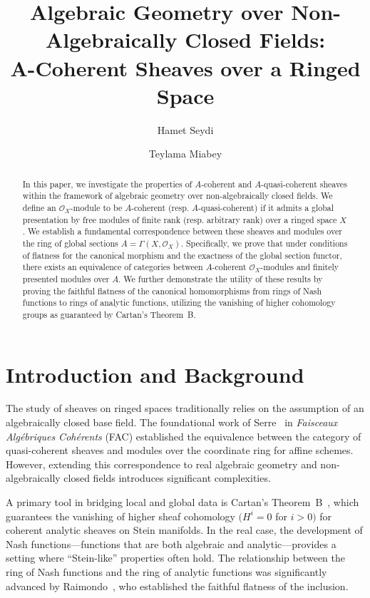 \documentclass[a4paper]{amsart}
\title{Algebraic Geometry over Non-Algebraically Closed Fields:\\
A-Coherent Sheaves over a Ringed Space}
\author[Hamet Seydi]{Hamet Seydi}
\author[Teylama Miabey]{Teylama Miabey}
\theoremstyle{definition}
\theoremstyle{definition}
\begin{document}
\begin{abstract}
In this paper, we investigate the properties of $A$-coherent and $A$-quasi-coherent sheaves within the framework of algebraic geometry over non-algebraically closed fields. We define an $\mathcal{O}_X$-module to be $A$-coherent (resp. $A$-quasi-coherent) if it admits a global presentation by free modules of finite rank (resp. arbitrary rank) over a ringed space $X$. We establish a fundamental correspondence between these sheaves and modules over the ring of global sections $A = \Gamma(X,\mathcal{O}_X)$. Specifically, we prove that under conditions of flatness for the canonical morphism and the exactness of the global section functor, there exists an equivalence of categories between $A$-coherent $\mathcal{O}_X$-modules and finitely presented modules over $A$. We further demonstrate the utility of these results by proving the faithful flatness of the canonical homomorphisms from rings of Nash functions to rings of analytic functions, utilizing the vanishing of higher cohomology groups as guaranteed by Cartan's Theorem~B.
\end{abstract}
\medskip




\maketitle

\section{Introduction and Background}

The study of sheaves on ringed spaces traditionally relies on the assumption of an algebraically closed base field. The foundational work of Serre~\cite{SerreFAC} in \emph{Faisceaux Alg\'ebriques Coh\'erents} (FAC) established the equivalence between the category of quasi-coherent sheaves and modules over the coordinate ring for affine schemes. However, extending this correspondence to real algebraic geometry and non-algebraically closed fields introduces significant complexities.

A primary tool in bridging local and global data is Cartan's Theorem~B~\cite{Cartan}, which guarantees the vanishing of higher sheaf cohomology $(H^i = 0$ for $i>0)$ for coherent analytic sheaves on Stein manifolds. In the real case, the development of Nash functions---functions that are both algebraic and analytic---provides a setting where ``Stein-like'' properties often hold. The relationship between the ring of Nash functions and the ring of analytic functions was significantly advanced by Raimondo~\cite{Raimondo}, who established the faithful flatness of the inclusion.
\end{document}
